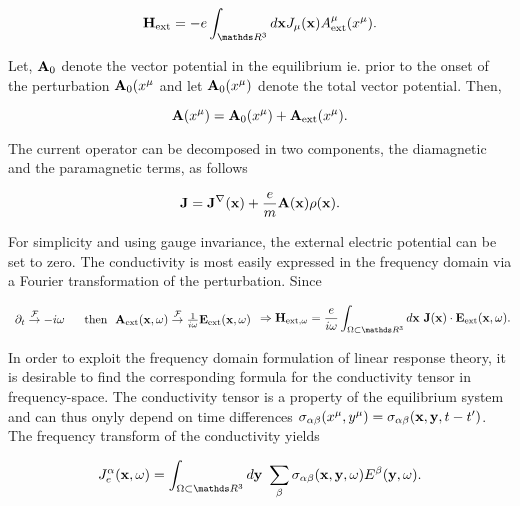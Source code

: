 \documentclass{homework}
\begin{document}
$$
\Hamiltonian_{\textnormal{ext}} = -e \int_{\R^3} d{\bf x} J_{\mu}({\bf x}) A^{\mu}_{\textnormal{ext}}(x^{\mu}).
$$

Let, ${\bf A}_0$ denote the vector potential in the equilibrium ie. prior to the onset of the perturbation ${\bf A}_0(x^{\mu}$ and let ${\bf A}_0(x^{\mu})$ denote the total vector potential. Then, 

$$
   {\bf A}(x^{\mu}) = {\bf A}_{0}(x^{\mu}) +  {\bf A}_{\textnormal{ext}}(x^{\mu}).
$$

The current operator can be decomposed in two components, the diamagnetic and the paramagnetic terms, as follows 

\begin{equation}
    {\bf J} = {\bf J}^{\nabla}({\bf x}) + \frac{e}{m} {\bf A}({\bf x}) \rho({\bf x}).  
\end{equation}

For simplicity and using gauge invariance, the external electric potential can be set to zero. The conductivity is most easily expressed in the frequency domain via a Fourier transformation of the perturbation. Since 

\begin{equation} \begin{array}{cc}
     \partial_t \overset{\mathcal{F}}{\rightarrow} -i\omega \blanky & \textnormal{ then } \blanky {\bf A}_{\textnormal{ext}}({\bf x}, \omega) \overset{\mathcal{F}}{\rightarrow}  \frac{1}{i\omega} {\bf E}_{\textnormal{ext}}({\bf x}, \omega) \\
\end{array}
     \Rightarrow \Hamiltonian_{\textnormal{ext}, \omega} = \frac{e}{i\omega} \int_{\Omega \subset \R^3} d{\bf x} \blanky {\bf J}({\bf x}) \cdot {\bf E}_{\textnormal{ext}}({\bf x}, \omega).
\end{equation}

In order to exploit the frequency domain formulation of linear response theory, it is desirable to find the corresponding formula for the conductivity tensor in frequency-space. The conductivity tensor is a property of the equilibrium system and can thus onyly depend on time differences $ \sigma_{\alpha \beta}(x^\mu, y^{\mu}) =  \sigma_{\alpha \beta}({\bf x},{\bf y}, t-t')$. The frequency transform of the conductivity yields

\begin{equation}
    J^{\alpha}_{e}({\bf x}, \omega) = \int_{\Omega \subset \R^3 } d{\bf y} \blanky \sum_{ \beta} \sigma_{\alpha \beta}({\bf x},{\bf y}, \omega) E^{\beta}({\bf y}, \omega).
\end{equation}
\end{document}
